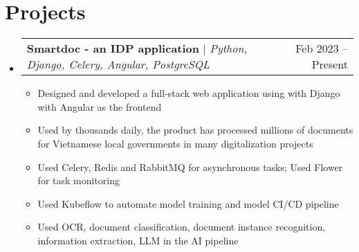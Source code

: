 \documentclass[letterpaper,11pt]{article}
\makeatletter
\newcommand{\resumeItem}[1]{
  \item\small{
    {#1 \vspace{-2pt}}
  }
}
\newcommand{\resumeProjectHeading}[2]{
    \item
    \begin{tabular*}{0.97\textwidth}{l@{\extracolsep{\fill}}r}
      \small#1 & #2 \\
    \end{tabular*}\vspace{-7pt}
}
\newcommand{\resumeSubHeadingListStart}{\begin{itemize}[leftmargin=0.15in, label={}]}
\newcommand{\resumeSubHeadingListEnd}{\end{itemize}}
\newcommand{\resumeItemListStart}{\begin{itemize}}
\newcommand{\resumeItemListEnd}{\end{itemize}\vspace{-5pt}}
\makeatother
\begin{document}
\section{Projects}
    \resumeSubHeadingListStart
      \resumeProjectHeading
          {\textbf{Smartdoc - an IDP application} $|$ \emph{Python, Django, Celery, Angular, PostgreSQL}}{Feb 2023 -- Present}
          \resumeItemListStart
            \resumeItem{Designed and developed a full-stack web application using with Django with Angular as the frontend}
            \resumeItem{Used by thousands daily, the product has processed millions of documents for Vietnamese local governments in many digitalization projects}
            \resumeItem{Used Celery, Redis and RabbitMQ for asynchronous tasks; Used Flower for task monitoring}
	 \resumeItem{Used Kubeflow to automate model training and model CI/CD pipeline}
	\resumeItem{Used OCR, document classification, document instance recognition, information extraction, LLM in the AI pipeline}
          \resumeItemListEnd
    \resumeSubHeadingListEnd



%
\end{document}
